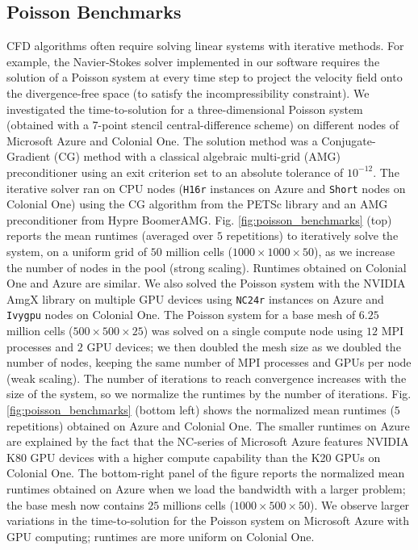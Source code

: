 \documentclass[10pt,journal,compsoc]{IEEEtran}
\begin{document}
\subsection{Poisson Benchmarks}\label{subsec:poisson_benchmarks}

CFD algorithms often require solving linear systems with iterative methods.
For example, the Navier-Stokes solver implemented in our software requires the solution of a Poisson system at every time step to project the velocity field onto the divergence-free space (to satisfy the incompressibility constraint).
We investigated the time-to-solution for a three-dimensional Poisson system (obtained with a 7-point stencil central-difference scheme) on different nodes of Microsoft Azure and Colonial One.
The solution method was a Conjugate-Gradient (CG) method with a classical algebraic multi-grid (AMG) preconditioner using an exit criterion set to an absolute tolerance of $10^{-12}$.
The iterative solver ran on CPU nodes (\texttt{H16r} instances on Azure and \texttt{Short} nodes on Colonial One) using the CG algorithm from the PETSc library\cite{balay_et_al_2018} and an AMG preconditioner from Hypre BoomerAMG.
Fig. \ref{fig:poisson_benchmarks} (top) reports the mean runtimes (averaged over $5$ repetitions) to iteratively solve the system, on a uniform grid of $50$ million cells ($1000 \times 1000 \times 50$), as we increase the number of nodes in the pool (strong scaling).
Runtimes obtained on Colonial One and Azure are similar.
We also solved the Poisson system with the NVIDIA AmgX library on multiple GPU devices using \texttt{NC24r} instances on Azure and \texttt{Ivygpu} nodes on Colonial One.
The Poisson system for a base mesh of $6.25$ million cells ($500 \times 500 \times 25$) was solved on a single compute node using $12$ MPI processes and $2$ GPU devices; we then doubled the mesh size as we doubled the number of nodes, keeping the same number of MPI processes and GPUs per node (weak scaling).
The number of iterations to reach convergence increases with the size of the system, so we normalize the runtimes by the number of iterations.
Fig. \ref{fig:poisson_benchmarks} (bottom left) shows the normalized mean runtimes ($5$ repetitions) obtained on Azure and Colonial One.
The smaller runtimes on Azure are explained by the fact that the NC-series of Microsoft Azure features NVIDIA K80 GPU devices with a higher compute capability than the K20 GPUs on Colonial One.
The bottom-right panel of the figure reports the normalized mean runtimes obtained on Azure when we load the bandwidth with a larger problem; the base mesh now contains $25$ millions cells ($1000 \times 500 \times 50$).
We observe larger variations in the time-to-solution for the Poisson system on Microsoft Azure with GPU computing; runtimes are more uniform on Colonial One.
\end{document}
